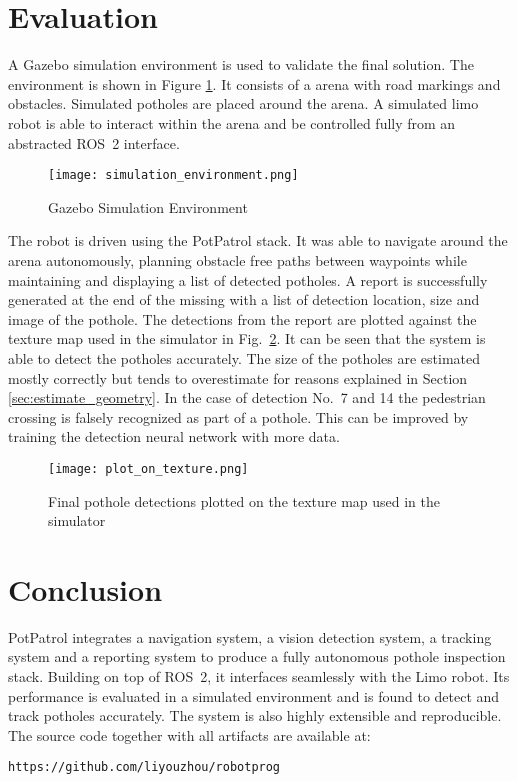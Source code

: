 \documentclass[conference]{IEEEtran}
\begin{document}
\section{Evaluation}

A Gazebo\cite{koenigDesignUseParadigms2004} simulation environment is used to validate the final solution. The environment is shown in Figure \ref{fig:gazebo}. It consists of a arena with road markings and obstacles. Simulated potholes are placed around the arena. A simulated limo robot is able to interact within the arena and be controlled fully from an abstracted ROS~2 interface.

\begin{figure}[ht]
    \centering
    \texttt{[image: simulation\_environment.png]}
    \caption{Gazebo Simulation Environment}
    \label{fig:gazebo}
\end{figure}

The robot is driven using the PotPatrol stack. It was able to navigate around the arena autonomously, planning obstacle free paths between waypoints while maintaining and displaying a list of detected potholes. A report is successfully generated at the end of the missing with a list of detection location, size and image of the pothole. The detections from the report are plotted against the texture map used in the simulator in Fig.~\ref{fig:plot_on_texture}. It can be seen that the system is able to detect the potholes accurately. The size of the potholes are estimated mostly correctly but tends to overestimate for reasons explained in Section \ref{sec:estimate_geometry}. In the case of detection No.~7 and 14 the pedestrian crossing is falsely recognized as part of a pothole. This can be improved by training the detection neural network with more data.

\begin{figure}
    \centering
    \texttt{[image: plot\_on\_texture.png]}
    \caption{Final pothole detections plotted on the texture map used in the simulator}
    \label{fig:plot_on_texture}
\end{figure}

\section{Conclusion}

PotPatrol integrates a navigation system, a vision detection system, a tracking system and a reporting system to produce a fully autonomous pothole inspection stack. Building on top of ROS~2, it interfaces seamlessly with the Limo robot. Its performance is evaluated in a simulated environment and is found to detect and track potholes accurately. The system is also highly extensible and reproducible. The source code together with all artifacts are available at:

\verb|https://github.com/liyouzhou/robotprog|



\end{document}
